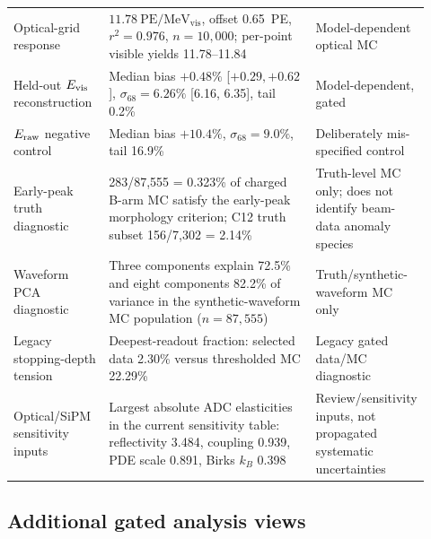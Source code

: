 \begin{longtable}{p{0.23\linewidth}p{0.52\linewidth}p{0.17\linewidth}}
Optical-grid response & $11.78~\mathrm{PE/MeV_{vis}}$, offset 0.65~PE, $r^2=0.976$, $n=10{,}000$; per-point visible yields 11.78--11.84 & Model-dependent optical MC \\
Held-out $E_{\rm vis}$ reconstruction & Median bias $+0.48\%$ [$+0.29,+0.62$], $\sigma_{68}=6.26\%$ [6.16, 6.35], tail 0.2\% & Model-dependent, gated \\
$E_{\rm raw}$ negative control & Median bias $+10.4\%$, $\sigma_{68}=9.0\%$, tail 16.9\% & Deliberately mis-specified control \\
Early-peak truth diagnostic & 283/87{,}555 = 0.323\% of charged B-arm MC satisfy the early-peak morphology criterion; C12 truth subset 156/7{,}302 = 2.14\% & Truth-level MC only; does not identify beam-data anomaly species \\
Waveform PCA diagnostic & Three components explain 72.5\% and eight components 82.2\% of variance in the synthetic-waveform MC population ($n=87{,}555$) & Truth/synthetic-waveform MC only \\
Legacy stopping-depth tension & Deepest-readout fraction: selected data 2.30\% versus thresholded MC 22.29\% & Legacy gated data/MC diagnostic \\
Optical/SiPM sensitivity inputs & Largest absolute ADC elasticities in the current sensitivity table: reflectivity 3.484, coupling 0.939, PDE scale 0.891, Birks $k_B$ 0.398 & Review/sensitivity inputs, not propagated systematic uncertainties \\
\bottomrule
\end{longtable}
\normalsize

\subsection{Additional gated analysis views}




